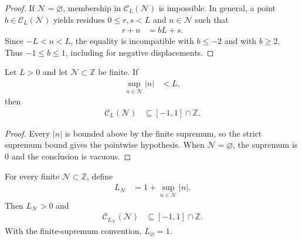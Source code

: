 \begin{proof}\leanok
    If $\mathcal N=\varnothing$, membership in
    $\mathcal C_L(\mathcal N)$ is impossible.  In general, a point
    $b\in\mathcal C_L(\mathcal N)$ yields residues $0\leq r,s<L$ and
    $n\in\mathcal N$ such that
    \begin{align}
        r+n & =bL+s.
    \end{align}
    Since $-L<n<L$, the equality is incompatible with $b\leq-2$ and with
    $b\geq2$.  Thus $-1\leq b\leq1$, including for negative displacements.
\end{proof}

\begin{lemma}
    \label{lem:qca_blocked_neighborhood_subset_nearest_neighbor_sup}
    \leanok
    Let $L>0$ and let $\mathcal N\subset\mathbb Z$ be finite.  If
    \begin{align}
        \sup_{n\in\mathcal N}|n| & <L,
    \end{align}
    then
    \begin{align}
        \mathcal C_L(\mathcal N) & \subseteq[-1,1]\cap\mathbb Z.
    \end{align}
\end{lemma}

\begin{proof}\leanok
    Every $|n|$ is bounded above by the finite supremum, so the strict
    supremum bound gives the pointwise hypothesis.  When
    $\mathcal N=\varnothing$, the supremum is $0$ and the conclusion is
    vacuous.
\end{proof}

\begin{lemma}
    \label{lem:qca_blocked_neighborhood_canonical_nearest_neighbor}
    \leanok
    For every finite $\mathcal N\subset\mathbb Z$, define
    \begin{align}
        L_{\mathcal N} & =1+\sup_{n\in\mathcal N}|n|.
    \end{align}
    Then $L_{\mathcal N}>0$ and
    \begin{align}
        \mathcal C_{L_{\mathcal N}}(\mathcal N)
         & \subseteq[-1,1]\cap\mathbb Z.
    \end{align}
    With the finite-supremum convention, $L_{\varnothing}=1$.
\end{lemma}


